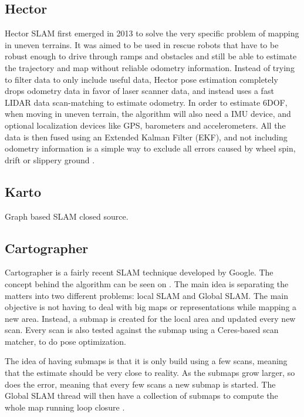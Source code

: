 \subsection{Hector}

Hector SLAM first emerged in 2013 to solve the very specific problem of mapping in uneven terrains. It was aimed to be used in rescue robots that have to be robust enough to drive through ramps and obstacles and still be able to estimate the trajectory and map without reliable odometry information. Instead of trying to filter data to only include useful data, Hector pose estimation completely drops odometry data in favor of laser scanner data, and instead uses a fast LIDAR data scan-matching to estimate odometry. In order to estimate 6DOF, when moving in uneven terrain, the algorithm will also need a IMU device, and optional localization devices  like GPS, barometers and accelerometers. All the data is then fused using an Extended Kalman Filter (EKF), and not including odometry information is a simple way to exclude all errors caused by wheel spin, drift or slippery ground \cite{kohlbrecher2011flexible}.

\subsection{Karto}

Graph based SLAM closed source.

\subsection{Cartographer}

Cartographer is a fairly recent SLAM technique developed by Google. The concept behind the algorithm can be seen on . The main idea is separating the matters into two different problems: local SLAM and Global SLAM. The main objective is not having to deal with big maps or representations while mapping a new area. Instead, a submap is created for the local area and updated every new scan. Every scan is also tested against the submap using a Ceres-based scan matcher, to do pose optimization.

The idea of having submaps is that it is only build using a few scans, meaning that the estimate should be very close to reality. As the submaps grow larger, so does the error, meaning that every few scans a new submap is started. The Global SLAM thread will then have a collection of submaps to compute the whole map running loop closure \cite{cartographer2016google}.

